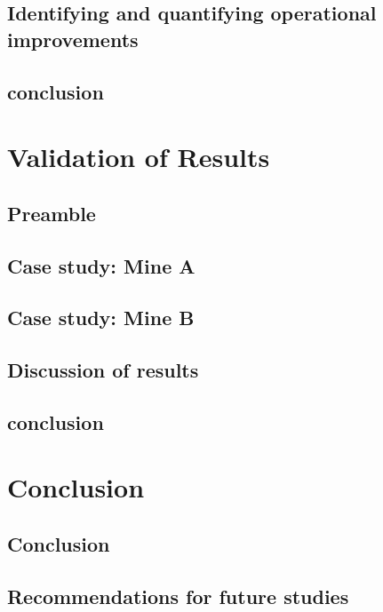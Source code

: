 \documentclass[12pt, english, oneside, singlespacing, open=any]{report}
\begin{document}
	\section{Identifying and quantifying operational improvements}
	\section{conclusion}
	
\chapter{Validation of Results}
	\section{Preamble}
	\section{Case study: Mine A}
	\section{Case study: Mine B}
	\section{Discussion of results}
	\section{conclusion}

	
\chapter{Conclusion}
	 \section{Conclusion}
	 \section{Recommendations for future studies}
\end{document}
